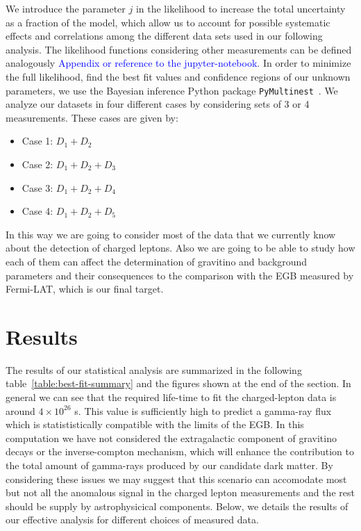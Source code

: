 \documentclass[a4paper,11pt]{article}
\newcommand*{\blue}{\textcolor{blue}}
\begin{document}
We introduce the parameter $j$ in the likelihood to increase the total uncertainty as a fraction of the model, which allow us to account for possible systematic effects and correlations among the different data sets used in our following analysis. The likelihood functions considering other measurements can be defined analogously \blue{Appendix or reference to the jupyter-notebook}. In order to minimize the full likelihood, find the best fit values and confidence regions of our unknown parameters, we use the Bayesian inference Python package \verb|PyMultinest|~\cite{Buchner:2014nha}. We analyze our datasets in four different cases by considering sets of 3 or 4 measurements. These cases are given by:

\begin{itemize}
\item Case 1: $D_1 + D_2$
\item Case 2: $D_1 + D_2 + D_3$
\item Case 3: $D_1 + D_2 + D_4$
\item Case 4: $D_1 + D_2 + D_5$
\end{itemize}

In this way we are going to consider most of the data that we currently know about the detection of charged leptons. Also we are going to be able to study how each of them can affect the determination of gravitino and background parameters and their consequences to the comparison with the EGB measured by Fermi-LAT, which is our final target.

\section{Results}

The results of our statistical analysis are summarized in the following table~\ref{table:best-fit-summary} and the figures shown at the end of the section. In general we can see that the required life-time to fit the charged-lepton data is around $4\times 10^{26}$ s. This value is sufficiently high to predict a gamma-ray flux which is statististically compatible with the limits of the EGB. In this computation we have not considered the extragalactic component of gravitino decays or the inverse-compton mechanism, which will enhance the contribution to the total amount of gamma-rays produced by our candidate dark matter. By considering these issues we may suggest that this scenario can accomodate
most but not all the anomalous signal in the charged lepton measurements and the rest should be supply by astrophysicical components. Below, we details the results of our effective analysis for different choices
of measured data.  
\end{document}
